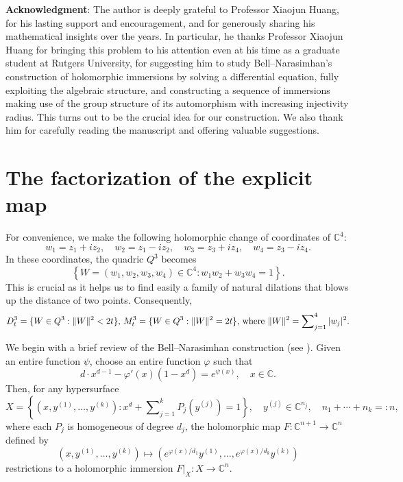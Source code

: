 \documentclass[11pt,a4paper,reqno]{amsart}
\begin{document}
{\bf \noindent Acknowledgment}:
The author is deeply grateful to Professor Xiaojun Huang, for his lasting support and encouragement, and for generously sharing his mathematical insights over the years. In particular, he  thanks Professor Xiaojun  Huang for  bringing this problem to his attention even at his time as a graduate student at Rutgers University, for suggesting him to  study  Bell--Narasimhan's construction of holomorphic immersions by solving a differential equation, fully exploiting the algebraic structure, and constructing a sequence of immersions making use of the group structure of its automorphism with increasing injectivity radius. This turns out to be the crucial idea for our construction.  We also thank him for carefully reading the manuscript and offering valuable suggestions.


\section{The factorization of the explicit map}

For convenience, we make the following holomorphic change of
coordinates of $\mathbb C^4$:
\begin{equation*}%
 w_1=z_1+iz_2,\quad w_2=z_1-iz_2,\quad
 w_3=z_3+iz_4,\quad w_4=z_3-iz_4.
\end{equation*}
In these coordinates, the quadric $Q^3$ becomes
\[
 \left\{W=(w_1,w_2,w_3,w_4)\in\mathbb C^4:     w_1w_2+w_3w_4=1\right\}.
\]
This is crucial  as it helps us  to find easily  a family of natural dilations that  blows up the distance of two points.
Consequently,
\begin{equation*}%
D_t^3=\{W\in Q^3:\|W\|^2<2t\},\,M_t^3=\{W\in Q^3:\|W\|^2=2t\},\,{\rm where\,\,}\|W\|^2=\sum\nolimits_{j=1}^4|w_j|^2.
\end{equation*}

We begin with a brief review of the Bell--Narasimhan construction (see \cite[Page 19]{Bell}). Given an entire function $\psi$, choose an entire function $\varphi$ such that
\begin{equation}\label{dd}
d\cdot x^{d-1}-\varphi'(x)(1-x^d)=e^{\psi(x)},\quad x\in\mathbb C.
\end{equation}
Then, for any hypersurface
\begin{equation*}
X=\left\{
 (x,y^{(1)},\ldots,y^{(k)}):
 x^d+\sum\nolimits_{j=1}^k P_j(y^{(j)})=1
 \right\},\quad y^{(j)}\in\mathbb C^{n_j},\quad n_1+\cdots+n_k=:n,
\end{equation*}
where each \(P_j\) is homogeneous of degree \(d_j\), the holomorphic map $F:\mathbb C^{n+1}\to\mathbb C^n$ defined by
\begin{equation*}
 (x,y^{(1)},\ldots,y^{(k)})
 \longmapsto
(e^{\varphi(x)/d_1}y^{(1)},\ldots,
 e^{\varphi(x)/d_k}y^{(k)})
\end{equation*}
restrictions to a holomorphic immersion \(F|_X:X\to\mathbb C^n\).
\end{document}
